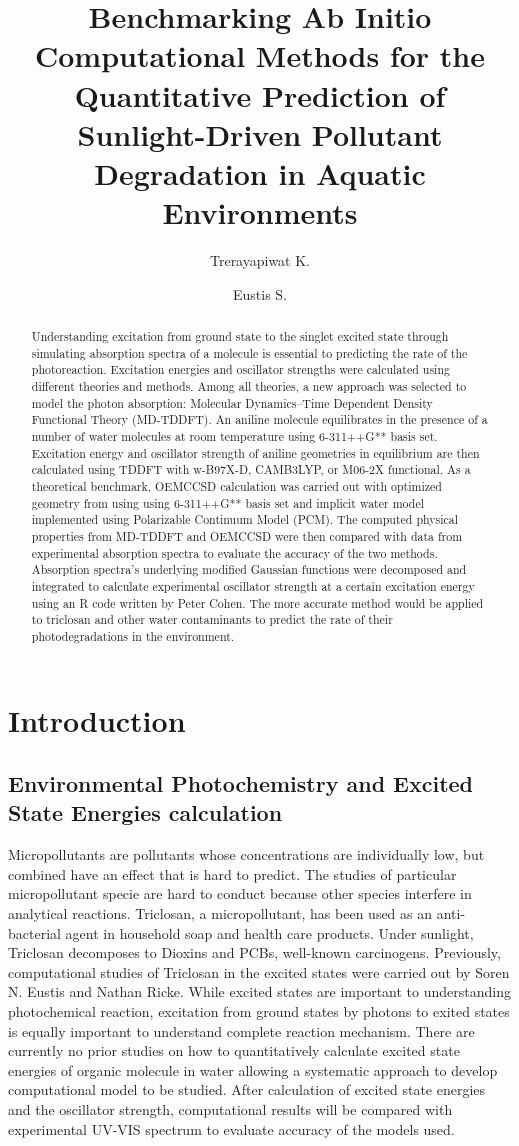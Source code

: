 \documentclass[
journal=jacsat, %
manuscript=article]{achemso}
\author{Trerayapiwat K.}
\affiliation[Bowdoin College]
{Department of Chemistry, Bowdoin College, Brunswick, ME}
\author{Eustis S.}
\affiliation[Bowdoin College]
{Department of Chemistry, Bowdoin College, Brunswick, ME}
\title[\texttt{achemso} demonstration]
{Benchmarking Ab Initio Computational Methods for the Quantitative Prediction of Sunlight-Driven Pollutant Degradation in Aquatic Environments}
\begin{document}
\begin{abstract}
Understanding excitation from ground state to the singlet excited state through simulating absorption spectra of a molecule is essential to predicting the rate of the photoreaction. Excitation energies and oscillator strengths were calculated using different theories and methods. Among all theories, a new approach was selected to model the photon absorption: Molecular Dynamics–Time Dependent Density Functional Theory (MD-TDDFT). An aniline molecule equilibrates in the presence of a number of water molecules at room temperature using 6-311++G** basis set. Excitation energy and oscillator strength of aniline geometries in equilibrium are then calculated using TDDFT with w-B97X-D, CAMB3LYP, or M06-2X functional. As a theoretical benchmark, OEMCCSD calculation was carried out with optimized geometry from using using 6-311++G** basis set and implicit water model implemented using Polarizable Continuum Model (PCM). The computed physical properties from MD-TDDFT and OEMCCSD were then compared with data from experimental absorption spectra to evaluate the accuracy of the two methods. Absorption spectra’s underlying modified Gaussian functions were decomposed and integrated to calculate experimental oscillator strength at a certain excitation energy using an R code written by Peter Cohen. The more accurate method would be applied to triclosan and other water contaminants to predict the rate of their photodegradations in the environment.
\end{abstract}


\section{Introduction}

\subsection{Environmental Photochemistry and Excited State Energies calculation}

Micropollutants are pollutants whose concentrations are individually low, but combined have an effect that is hard to predict. The studies of particular micropollutant specie are hard to conduct because other species interfere in analytical reactions. Triclosan, a micropollutant, has been used as an anti-bacterial agent in household soap and health care products. Under sunlight, Triclosan decomposes to Dioxins and PCBs, well-known carcinogens.\cite{Bedoux2012} Previously, computational studies of Triclosan in the excited states were carried out by Soren N. Eustis\cite{Kliegman2013} and Nathan Ricke.\cite{Ricke2014} While excited states are important to understanding photochemical reaction, excitation from ground states by photons to exited states is equally important to understand complete reaction mechanism. There are currently no prior studies on how to quantitatively calculate excited state energies of organic molecule in water allowing a systematic approach to develop computational model to be studied. After calculation of excited state energies and the oscillator strength, computational results will be compared with experimental UV-VIS spectrum to evaluate accuracy of the models used. 
\end{document}
